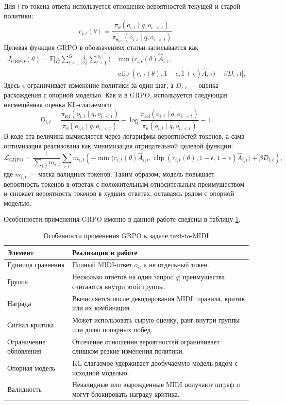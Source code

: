 \documentclass[a4paper,12pt]{extarticle}
\begin{document}
Для $t$-го токена ответа используется отношение вероятностей текущей и
старой политики:
\[
r_{i,t}(\theta)=
\frac{\pi_\theta(o_{i,t}\mid q,o_{i,<t})}
{\pi_{\theta_{\mathrm{old}}}(o_{i,t}\mid q,o_{i,<t})}.
\]
Целевая функция GRPO в обозначениях статьи записывается как
\[
\begin{aligned}
J_{\mathrm{GRPO}}(\theta)
=
\mathbb{E}\Bigg[
\frac{1}{G}\sum_{i=1}^{G}\frac{1}{|o_i|}
\sum_{t=1}^{|o_i|}
\Big(
&\min\big(
r_{i,t}(\theta)\hat{A}_{i,t},\\
&\operatorname{clip}(r_{i,t}(\theta),1-\epsilon,1+\epsilon)\hat{A}_{i,t}
\big)
-\beta D_{i,t}
\Big)
\Bigg].
\end{aligned}
\]
Здесь $\epsilon$ ограничивает изменение политики за один шаг, а
$D_{i,t}$ --- оценка расхождения с опорной моделью. Как и в GRPO,
используется следующая несмещённая оценка KL-слагаемого:
\[
D_{i,t} =
\frac{\pi_{\mathrm{ref}}(o_{i,t}\mid q,o_{i,<t})}
{\pi_\theta(o_{i,t}\mid q,o_{i,<t})}
-
\log
\frac{\pi_{\mathrm{ref}}(o_{i,t}\mid q,o_{i,<t})}
{\pi_\theta(o_{i,t}\mid q,o_{i,<t})}
-1.
\]
В коде эта величина вычисляется через логарифмы вероятностей токенов, а
сама оптимизация реализована как минимизация отрицательной целевой
функции:
\[
\mathcal{L}_{\mathrm{GRPO}} =
\frac{1}{\sum_{i,t} m_{i,t}}
\sum_{i,t} m_{i,t}
\left(
-\min\big(
r_{i,t}(\theta)\hat{A}_{i,t},
\operatorname{clip}(r_{i,t}(\theta),1-\epsilon,1+\epsilon)\hat{A}_{i,t}
\big)
+\beta D_{i,t}
\right),
\]
где $m_{i,t}$ --- маска валидных токенов. Таким образом, модель
повышает вероятность токенов в ответах с положительным относительным
преимуществом и снижает вероятность токенов в худших ответах, оставаясь
рядом с опорной моделью.

Особенности применения GRPO именно в данной работе сведены в таблицу
\ref{tab:grpo_midi_specifics}.

\begin{table}[ht]
\centering
\caption{Особенности применения GRPO к задаче text-to-MIDI}
\label{tab:grpo_midi_specifics}
\begin{tabular}{p{}p{}}
\toprule
Элемент & Реализация в работе \\
\midrule
Единица сравнения & Полный MIDI-ответ $o_i$, а не отдельный токен. \\
Группа & Несколько ответов на один запрос $q$; преимущества считаются внутри этой группы. \\
Награда & Вычисляется после декодирования MIDI: правила, критик или их комбинация. \\
Сигнал критика & Может использовать сырую оценку, ранг внутри группы или долю попарных побед. \\
Ограничение обновления & Отсечение отношения вероятностей ограничивает слишком резкие изменения политики. \\
Опорная модель & KL-слагаемое удерживает дообучаемую модель рядом с исходной моделью. \\
Валидность & Невалидные или вырожденные MIDI получают штраф и могут блокировать награду критика. \\
\bottomrule
\end{tabular}
\end{table}
\end{document}
